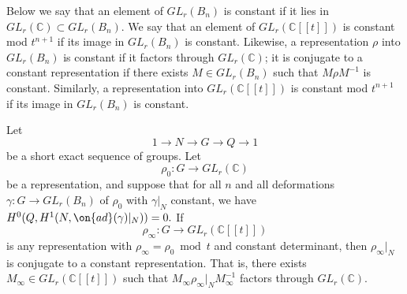 Below we say that an element of $GL_r(B_n)$ is constant if it lies in $GL_r(\mathbb{C})\subset GL_r(B_n)$. We say that an element of $GL_r(\mathbb{C}[[t]])$ is constant mod $t^{n+1}$ if its image in $GL_r(B_n)$ is constant. Likewise, a representation $\rho$ into $GL_r(B_n)$ is constant if it factors through $GL_r(\mathbb{C})$; it is conjugate to a constant representation if there exists $M\in GL_r(B_n)$ such that $M\rho M^{-1}$ is constant. Similarly, a representation into $GL_r(\mathbb{C}[[t]])$ is constant mod $t^{n+1}$ if its image in $GL_r(B_n)$ is constant.
\begin{proposition}
\notready\label{prop:stacky-split-constancy}
	Let $$1\to N\to G\to Q\to 1$$ be a short exact sequence of groups. Let $$\rho_0: G\to GL_r(\mathbb{C})$$ be a representation, and suppose that for all $n$ and all deformations $\gamma: G\to GL_r(B_n)$ of $\rho_0$ with $\gamma|_N$ constant, we have $H^0(Q, H^1(N, \on{ad}(\gamma)|_N))=0.$ If $$\rho_\infty: G\to GL_r(\mathbb{C}[[t]])$$ is any representation with $\rho_\infty=\rho_0\bmod t$ and constant determinant, then $\rho_\infty|_N$ is conjugate to a constant representation. That is, there exists $M_\infty\in GL_r(\mathbb{C}[[t]])$ such that $M_\infty\rho_\infty|_NM_\infty^{-1}$ factors through $GL_r(\mathbb{C})$.
\end{proposition}
